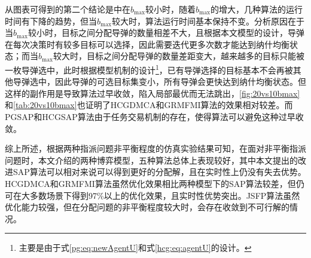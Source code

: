 从图表可得到的第二个结论是中在$b_{\text{max}}$较小时，随着$b_{\text{max}}$的增大，几种算法的运行时间有下降的趋势，但当$b_{\text{max}}$较大时，算法运行时间基本保持不变。分析原因在于当$b_{\text{max}}$较小时，目标之间分配导弹的数量相差不大，且根据本文模型的设计，导弹在每次决策时有较多目标可以选择，因此需要迭代更多次数才能达到纳什均衡状态；而当$b_{\text{max}}$较大时，目标之间分配导弹的数量差距变大，越来越多的目标只能被一枚导弹选中，此时根据模型机制的设计\footnote{主要是由于式\ref{pg:eq:newAgentU}和式\ref{hcg:eq:agentU}的设计。}，已有导弹选择的目标基本不会再被其他导弹选中，因此导弹的可选目标集变小，所有导弹会更快达到纳什均衡状态。但这样的副作用是导致算法过早收敛，陷入局部最优而无法跳出，\ref{fig:20vs10bmax}和\ref{tab:20vs10bmax}也证明了HCGDMCA和GRMFMI算法的效果相对较差。而PGSAP和HCGSAP算法由于任务交易机制的存在，使得算法可以避免这种过早收敛。

综上所述，根据两种指派问题非平衡程度的仿真实验结果可知，在面对非平衡指派问题时，本文介绍的两种博弈模型，五种算法总体上表现较好，其中本文提出的改进SAP算法可以相对来说可以得到更好的分配解，且在实时性上仍没有失去优势。HCGDMCA和GRMFMI算法虽然优化效果相比两种模型下的SAP算法较差，但仍可在大多数场景下得到97\%以上的优化效果，且实时性优势突出。JSFP算法虽然优化能力较强，但在分配问题的非平衡程度较大时，会存在收敛到不可行解的情况。




